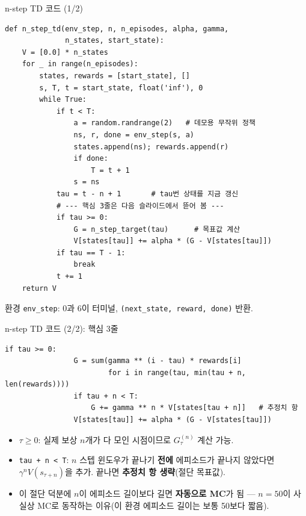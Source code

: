 \documentclass[aspectratio=169,11pt]{beamer}
\begin{document}
\begin{frame}[fragile]{n-step TD 코드 (1/2)}
  \begin{lstlisting}[basicstyle=\ttfamily\footnotesize]
def n_step_td(env_step, n, n_episodes, alpha, gamma,
              n_states, start_state):
    V = [0.0] * n_states
    for _ in range(n_episodes):
        states, rewards = [start_state], []
        s, T, t = start_state, float('inf'), 0
        while True:
            if t < T:
                a = random.randrange(2)   # 데모용 무작위 정책
                ns, r, done = env_step(s, a)
                states.append(ns); rewards.append(r)
                if done:
                    T = t + 1
                s = ns
            tau = t - n + 1       # tau번 상태를 지금 갱신
            # --- 핵심 3줄은 다음 슬라이드에서 뜯어 봄 ---
            if tau >= 0:
                G = n_step_target(tau)      # 목표값 계산
                V[states[tau]] += alpha * (G - V[states[tau]])
            if tau == T - 1:
                break
            t += 1
    return V
  \end{lstlisting}
  {\footnotesize 환경 \texttt{env\_step}: 0과 6이 터미널,
  \texttt{(next\_state, reward, done)} 반환.}
\end{frame}

\begin{frame}[fragile]{n-step TD 코드 (2/2): 핵심 3줄}
  \begin{lstlisting}[basicstyle=\ttfamily\footnotesize]
            if tau >= 0:
                G = sum(gamma ** (i - tau) * rewards[i]
                        for i in range(tau, min(tau + n, len(rewards))))
                if tau + n < T:
                    G += gamma ** n * V[states[tau + n]]   # 추정치 항
                V[states[tau]] += alpha * (G - V[states[tau]])
  \end{lstlisting}
  \begin{itemize}
    \item $\tau \ge 0$: 실제 보상 $n$개가 다 모인 시점이므로 $G_\tau^{(n)}$
      계산 가능.
    \item \texttt{tau + n < T}: $n$ 스텝 윈도우가 끝나기 \textbf{전에}
      에피소드가 끝나지 않았다면 $\gamma^n V(s_{\tau+n})$을 추가.
      끝나면 \textbf{추정치 항 생략}(절단 목표값).
    \item 이 절단 덕분에 $n$이 에피소드 길이보다 길면 \textbf{자동으로
      MC}가 됨 --- $n=50$이 사실상 MC로 동작하는 이유(이 환경 에피소드
      길이는 보통 50보다 짧음).
  \end{itemize}
\end{frame}
\end{document}
